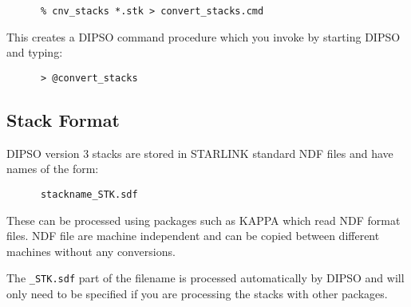 \begin{verbatim}
      % cnv_stacks *.stk > convert_stacks.cmd
\end{verbatim}

This creates a DIPSO command procedure which you invoke by
starting DIPSO and typing:

\begin{verbatim}
      > @convert_stacks
\end{verbatim}

\subsection{Stack Format}

DIPSO version 3 stacks are stored in STARLINK standard NDF files
and have names of the form:

\begin{verbatim}
      stackname_STK.sdf
\end{verbatim}

These can be processed using packages such as KAPPA which read
NDF format files. NDF file are machine independent and can 
be copied between different machines without any conversions.

The {\tt \_STK.sdf} part of the filename is processed automatically by
DIPSO and will only need to be specified if you are processing
the stacks with other packages.



